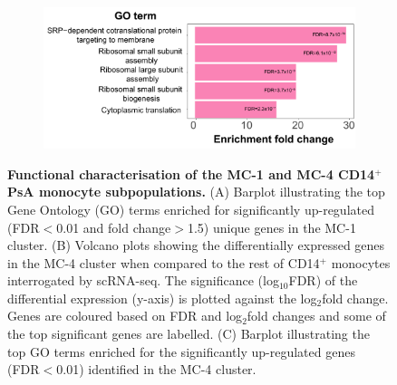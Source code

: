 \begin{figure}[htbp]
\begin{subfigure}[b]{0.50\textwidth}
		\caption{}
	\end{subfigure}%
	~
	\begin{subfigure}[b]{0.50\textwidth} 
		\centering
		\includegraphics[width=\textwidth]{./Results3/pdfs/PSA_scanpy_single_cell_cluster_4_upregulated_GO_barplot}
		\caption{}
	\end{subfigure}%
	\caption[Functional characterisation of the MC-1 and MC-4 CD14$^+$ PsA monocyte subpopulations.]{\textbf{Functional characterisation of the MC-1 and MC-4 CD14$^+$ PsA monocyte subpopulations.} (A) Barplot illustrating the top Gene Ontology (GO) terms enriched for significantly up-regulated (FDR$<$0.01 and fold change$>$1.5) unique genes in the MC-1 cluster. (B) Volcano plots showing the differentially expressed genes in the MC-4 cluster when compared to the rest of CD14$^+$ monocytes interrogated by scRNA-seq. The significance (log$_{10}$FDR) of the differential expression (y-axis) is plotted against the log${_2}$fold change. Genes are coloured based on FDR and log$_{2}$fold changes and some of the top significant genes are labelled. (C) Barplot illustrating the top GO terms enriched for the significantly up-regulated genes (FDR$<$0.01) identified in the MC-4 cluster.}
\label{figure:PsA_scRNAseq_MC1_MC2_characterisation}
\end{figure}

